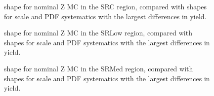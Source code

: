 \begin{figure}[tbhp]
\centering
\caption{
\mindphijm shape for nominal Z MC in the SRC region, compared with shapes for scale and PDF systematics with the largest differences in yield.
}
\label{fig:mindphijm_SRC} 
\end{figure} 

\begin{figure}[tbhp]
\centering
\caption{
\mindphijm shape for nominal Z MC in the SRLow region, compared with shapes for scale and PDF systematics with the largest differences in yield.
}
\label{fig:mindphijm_SRLow} 
\end{figure} 

\begin{figure}[tbhp]
\centering
\caption{
\mindphijm shape for nominal Z MC in the SRMed region, compared with shapes for scale and PDF systematics with the largest differences in yield.
}
\label{fig:mindphijm_SRMed} 
\end{figure} 